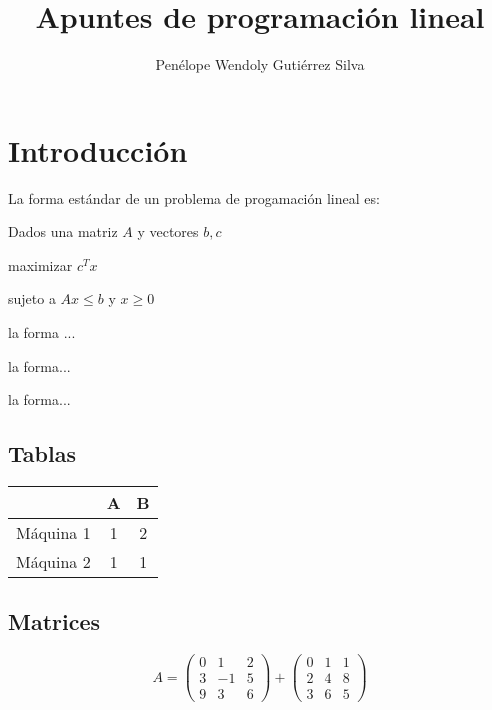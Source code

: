 \documentclass{article}
\title{Apuntes de programación lineal}
\author{Penélope Wendoly Gutiérrez Silva}
\begin{document}
\maketitle
\tableofcontents

\section{Introducción}
\label{sec:introduccion}




La forma estándar de un problema de progamación lineal es:

Dados una matriz $A$ y vectores $b,c$

maximizar $c^{T}x$

sujeto a $Ax\leq b$ y $x \geq 0$

\smallskip

la forma ...

\medskip

la forma...

\bigskip

la forma...

\subsection{Tablas}

\begin{tabular}{|c|c|c|}
\hline
  & A & B  \\
  \hline
  Máquina 1 & 1&2\\
  \hline
  Máquina 2& 1&1\\
  \hline
  \end{tabular}

\subsection{Matrices}
\begin{equation}
  \label{eq:1}
  A=
  \begin{pmatrix}
    0 & 1 & 2\\
    3 & -1 & 5\\
    9 & 3 & 6
  \end{pmatrix}
  +
  \begin{pmatrix}
    0& 1 & 1\\
    2 & 4 & 8\\
    3 & 6 & 5 
   \end{pmatrix}
\end{equation}
\end{document}
